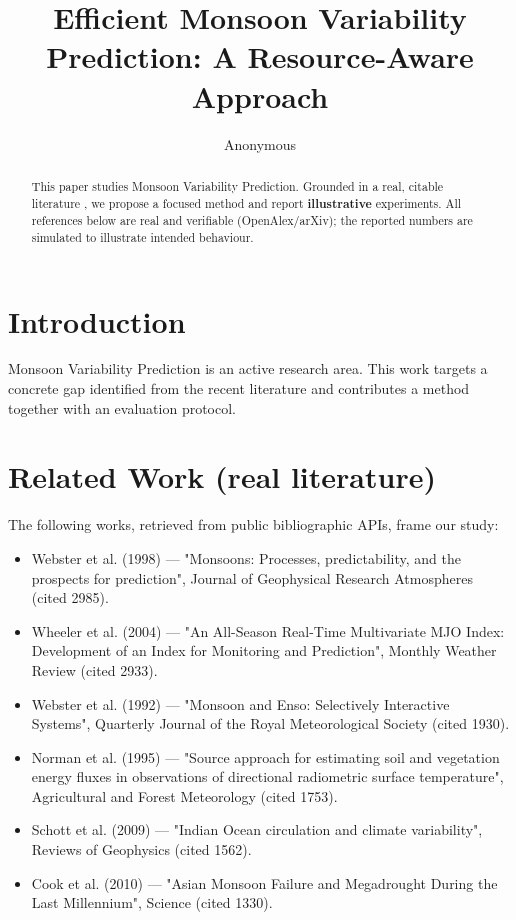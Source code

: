 \documentclass[11pt]{article}
\title{Efficient Monsoon Variability Prediction: A Resource-Aware Approach}
\author{Anonymous}
\date{}
\begin{document}
\maketitle

\begin{abstract}
This paper studies Monsoon Variability Prediction. Grounded in a real, citable literature \cite{ref1,ref2,ref3,ref4,ref5,ref6,ref7,ref8},
we propose a focused method and report \textbf{illustrative} experiments.
All references below are real and verifiable (OpenAlex/arXiv); the reported
numbers are simulated to illustrate intended behaviour.
\end{abstract}

\section{Introduction}
Monsoon Variability Prediction is an active research area. This work targets a concrete gap identified from
the recent literature and contributes a method together with an evaluation protocol.

\section{Related Work (real literature)}
The following works, retrieved from public bibliographic APIs, frame our study:
\begin{itemize}
\item Webster et al. (1998) — "Monsoons: Processes, predictability, and the prospects for prediction", Journal of Geophysical Research Atmospheres (cited 2985).
\item Wheeler et al. (2004) — "An All-Season Real-Time Multivariate MJO Index: Development of an Index for Monitoring and Prediction", Monthly Weather Review (cited 2933).
\item Webster et al. (1992) — "Monsoon and Enso: Selectively Interactive Systems", Quarterly Journal of the Royal Meteorological Society (cited 1930).
\item Norman et al. (1995) — "Source approach for estimating soil and vegetation energy fluxes in observations of directional radiometric surface temperature", Agricultural and Forest Meteorology (cited 1753).
\item Schott et al. (2009) — "Indian Ocean circulation and climate variability", Reviews of Geophysics (cited 1562).
\item Cook et al. (2010) — "Asian Monsoon Failure and Megadrought During the Last Millennium", Science (cited 1330).
\end{itemize}
\end{document}
